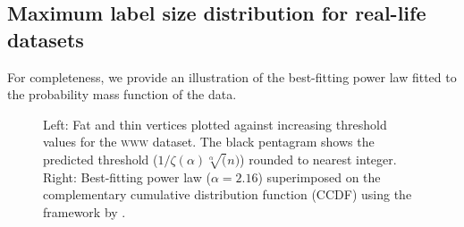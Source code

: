 \subsection{Maximum label size distribution for real-life datasets}\label{App:ExpRes:MaxLabelEmp}
For completeness,  we  provide an illustration of the best-fitting power law fitted to the probability mass function of the data.


\begin{figure}[!ht]
\centering
{}%
%
\caption{Left: Fat and thin vertices plotted against increasing threshold values for the \textsc{www} dataset. The black pentagram shows the predicted threshold ($1/\zeta(\alpha)\sqrt[\alpha](n)$) rounded to nearest integer. Right: Best-fitting power law ($\alpha = 2.16$) superimposed on the complementary cumulative distribution function (CCDF) using the framework by \cite{clauset2009power}.} %
\label{fig:www}%
\end{figure}


